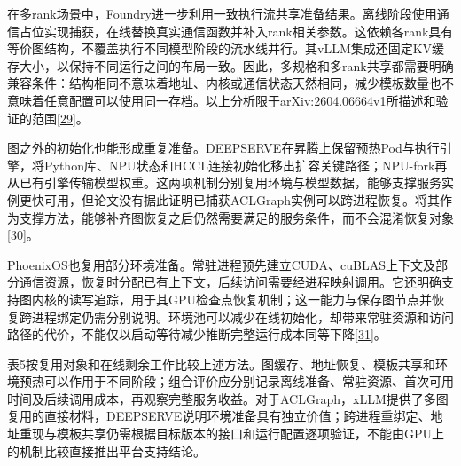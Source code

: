 \documentclass[UTF8,11pt,fontset=windows]{ctexart}
\begin{document}
在多rank场景中，Foundry进一步利用一致执行流共享准备结果。离线阶段使用通信占位实现捕获，在线替换真实通信函数并补入rank相关参数。这依赖各rank具有等价图结构，不覆盖执行不同模型阶段的流水线并行。其vLLM集成还固定KV缓存大小，以保持不同运行之间的布局一致。因此，多规格和多rank共享都需要明确兼容条件：结构相同不意味着地址、内核或通信状态天然相同，减少模板数量也不意味着任意配置可以使用同一存档。以上分析限于arXiv:2604.06664v1所描述和验证的范围\protect\hyperlink{ref-29}{{[}29{]}}。

图之外的初始化也能形成重复准备。DEEPSERVE在昇腾上保留预热Pod与执行引擎，将Python库、NPU状态和HCCL连接初始化移出扩容关键路径；NPU-fork再从已有引擎传输模型权重。这两项机制分别复用环境与模型数据，能够支撑服务实例更快可用，但论文没有据此证明已捕获ACLGraph实例可以跨进程恢复。将其作为支撑方法，能够补齐图恢复之后仍然需要满足的服务条件，而不会混淆恢复对象\protect\hyperlink{ref-30}{{[}30{]}}。

PhoenixOS也复用部分环境准备。常驻进程预先建立CUDA、cuBLAS上下文及部分通信资源，恢复时分配已有上下文，后续访问需要经进程映射调用。它还明确支持图内核的读写追踪，用于其GPU检查点恢复机制；这一能力与保存图节点并恢复跨进程绑定仍需分别说明。环境池可以减少在线初始化，却带来常驻资源和访问路径的代价，不能仅以启动等待减少推断完整运行成本同等下降\protect\hyperlink{ref-31}{{[}31{]}}。

表5按复用对象和在线剩余工作比较上述方法。图缓存、地址恢复、模板共享和环境预热可以作用于不同阶段；组合评价应分别记录离线准备、常驻资源、首次可用时间及后续调用成本，再观察完整服务收益。对于ACLGraph，xLLM提供了多图复用的直接材料，DEEPSERVE说明环境准备具有独立价值；跨进程重绑定、地址重现与模板共享仍需根据目标版本的接口和运行配置逐项验证，不能由GPU上的机制比较直接推出平台支持结论。
\end{document}
